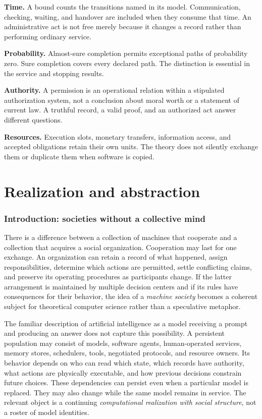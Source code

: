 \documentclass[11pt,letterpaper]{article}
\theoremstyle{plain}
\theoremstyle{definition}
\theoremstyle{remark}
\begin{document}
\noindent\textbf{Time.} A bound counts the transitions named in its model. Communication, checking, waiting, and handover are included when they consume that time. An administrative act is not free merely because it changes a record rather than performing ordinary service.

\noindent\textbf{Probability.} Almost-sure completion permits exceptional paths of probability zero. Sure completion covers every declared path. The distinction is essential in the service and stopping results.

\noindent\textbf{Authority.} A permission is an operational relation within a stipulated authorization system, not a conclusion about moral worth or a statement of current law. A truthful record, a valid proof, and an authorized act answer different questions.

\noindent\textbf{Resources.} Execution slots, monetary transfers, information access, and accepted obligations retain their own units. The theory does not silently exchange them or duplicate them when software is copied.
\clearpage

\part{Realization and abstraction}
\section{Introduction: societies without a collective mind}\label{sec:introduction}

There is a difference between a collection of machines that cooperate and a collection that acquires a social organization. Cooperation may last for one exchange. An organization can retain a record of what happened, assign responsibilities, determine which actions are permitted, settle conflicting claims, and preserve its operating procedures as participants change. If the latter arrangement is maintained by multiple decision centers and if its rules have consequences for their behavior, the idea of a \emph{machine society} becomes a coherent subject for theoretical computer science rather than a speculative metaphor.

The familiar description of artificial intelligence as a model receiving a prompt and producing an answer does not capture this possibility. A persistent population may consist of models, software agents, human-operated services, memory stores, schedulers, tools, negotiated protocols, and resource owners. Its behavior depends on who can read which state, which records have authority, what actions are physically executable, and how previous decisions constrain future choices. These dependencies can persist even when a particular model is replaced. They may also change while the same model remains in service. The relevant object is a continuing \emph{computational realization with social structure}, not a roster of model identities.
\end{document}
